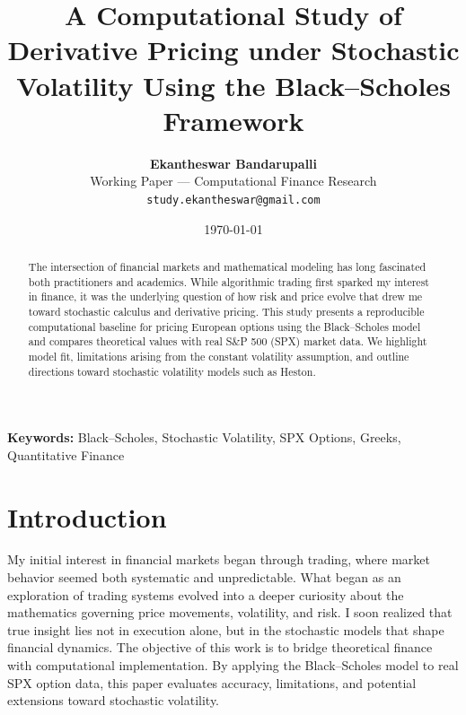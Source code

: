 \documentclass[12pt]{article}
\title{\textbf{A Computational Study of Derivative Pricing under Stochastic Volatility Using the Black--Scholes Framework}}
\author{\textbf{Ekantheswar Bandarupalli}\\
\small Working Paper --- Computational Finance Research\\
\small \texttt{study.ekantheswar@gmail.com}}
\date{\today}
\begin{document}
\maketitle
\thispagestyle{empty}

\begin{abstract}
The intersection of financial markets and mathematical modeling has long fascinated both practitioners and academics.
While algorithmic trading first sparked my interest in finance, it was the underlying question of how risk and price evolve
that drew me toward stochastic calculus and derivative pricing. This study presents a reproducible computational baseline for
pricing European options using the Black--Scholes model and compares theoretical values with real S\&P 500 (SPX) market data.
We highlight model fit, limitations arising from the constant volatility assumption, and outline directions toward stochastic
volatility models such as Heston.
\end{abstract}

\textbf{Keywords:} Black--Scholes, Stochastic Volatility, SPX Options, Greeks, Quantitative Finance


\newpage
\setcounter{page}{1}

\section{Introduction}
My initial interest in financial markets began through trading, where market behavior seemed both systematic and unpredictable.
What began as an exploration of trading systems evolved into a deeper curiosity about the mathematics governing price movements,
volatility, and risk. I soon realized that true insight lies not in execution alone, but in the stochastic models that shape
financial dynamics. The objective of this work is to bridge theoretical finance with computational implementation.
By applying the Black--Scholes model to real SPX option data, this paper evaluates accuracy, limitations, and potential extensions
toward stochastic volatility.

\end{document}
